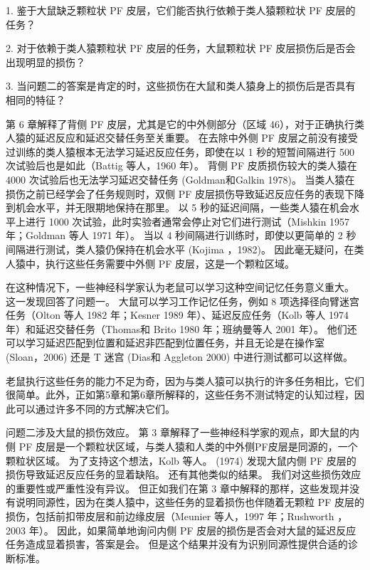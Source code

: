 \par 
1. 鉴于大鼠缺乏颗粒状 PF 皮层，它们能否执行依赖于类人猿颗粒状 PF 皮层的任务？
\par 
2. 对于依赖于类人猿颗粒状 PF 皮层的任务，大鼠颗粒状 PF 皮层损伤后是否会出现明显的损伤？
\par 
3. 当问题二的答案是肯定的时，这些损伤在大鼠和类人猿身上的损伤后是否具有相同的特征？
\par 
第 6 章解释了背侧 PF 皮层，尤其是它的中外侧部分（区域 46），对于正确执行类人猿的延迟反应和延迟交替任务至关重要。 在去除中外侧 PF 皮层之前没有接受过训练的类人猿根本无法学习延迟反应任务，即使在以 1 秒的短暂间隔进行 500 次试验后也是如此（Battig 等人，1960 年）。 背侧 PF 皮质损伤较大的类人猿在 4000 次试验后也无法学习延迟交替任务 (Goldman和Galkin 1978)。 当类人猿在损伤之前已经学会了任务规则时，双侧 PF 皮层损伤导致延迟反应任务的表现下降到机会水平，并无限期地保持在那里。 以 5 秒的延迟间隔，一些类人猿在机会水平上进行 1000 次试验，此时实验者通常会停止对它们进行测试（Mishkin 1957 年；Goldman 等人 1971 年）。 当以 4 秒间隔进行训练时，即使以更简单的 2 秒间隔进行测试，类人猿仍保持在机会水平 (Kojima ，1982)。 因此毫无疑问，在类人猿中，执行这些任务需要中外侧 PF 皮层，这是一个颗粒区域。
\par 
在这种情况下，一些神经科学家认为老鼠可以学习这种空间记忆任务意义重大。 这一发现回答了问题一。 大鼠可以学习工作记忆任务，例如 8 项选择径向臂迷宫任务（Olton 等人 1982 年；Kesner 1989 年）、延迟反应任务（Kolb 等人 1974 年）和延迟交替任务（Thomas和 Brito 1980 年；班纳曼等人 2001 年）。 他们还可以学习延迟匹配到位置和延迟非匹配到位置任务，并且无论是在操作室 (Sloan，2006) 还是 T 迷宫 (Dias和 Aggleton 2000) 中进行测试都可以这样做。
\par 
老鼠执行这些任务的能力不足为奇，因为与类人猿可以执行的许多任务相比，它们很简单。此外，正如第5章和第6章所解释的，这些任务不测试特定的认知过程，因此可以通过许多不同的方式解决它们。
\par 
问题二涉及大鼠的损伤效应。 第 3 章解释了一些神经科学家的观点，即大鼠的内侧 PF 皮层是一个颗粒状区域，与类人猿和人类的中外侧PF皮层是同源的，一个颗粒状区域。 为了支持这个想法，Kolb 等人。 (1974) 发现大鼠内侧 PF 皮层的损伤导致延迟反应任务的显着缺陷。 还有其他类似的结果。 我们对这些损伤效应的重要性或严重性没有异议。 但正如我们在第 3 章中解释的那样，这些发现并没有说明同源性，因为在类人猿中，这些任务的显着损伤也伴随着无颗粒 PF 皮层的损伤，包括前扣带皮层和前边缘皮层（Meunier 等人，1997 年；Rushworth ，2003 年）。 因此，如果简单地询问内侧 PF 皮层的损伤是否会对大鼠的延迟反应任务造成显着损害，答案是会。 但是这个结果并没有为识别同源性提供合适的诊断标准。
